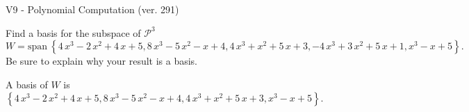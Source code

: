 \begin{exercise}
  \begin{exerciseTitle}V9 - Polynomial Computation (ver. 291)\end{exerciseTitle}
  \begin{exerciseStatement}
    Find a basis for the subspace of \(\mathcal{P}^3\) 
\[W=\mathrm{span}\ \left\{4 \, x^{3} - 2 \, x^{2} + 4 \, x + 5 , 8 \, x^{3} - 5 \, x^{2} - x + 4 , 4 \, x^{3} + x^{2} + 5 \, x + 3 , -4 \, x^{3} + 3 \, x^{2} + 5 \, x + 1 , x^{3} - x + 5\right\}.\]
 Be sure to explain why your result is a basis.


  \end{exerciseStatement}
  \begin{exerciseAnswer}
   A basis of \(W\) is  \(\left\{4 \, x^{3} - 2 \, x^{2} + 4 \, x + 5 , 8 \, x^{3} - 5 \, x^{2} - x + 4 , 4 \, x^{3} + x^{2} + 5 \, x + 3 , x^{3} - x + 5\right\}\).
  


  \end{exerciseAnswer}
\end{exercise}